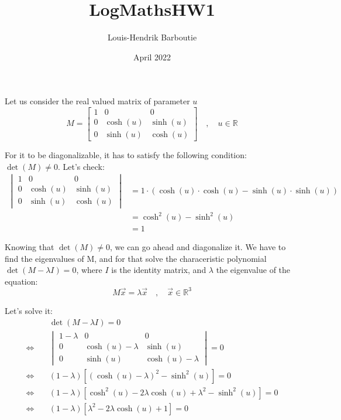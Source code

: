 \documentclass{article}
\title{LogMathsHW1}
\author{Louis-Hendrik Barboutie}
\date{April 2022}
\begin{document}
\maketitle

Let us consider the real valued matrix of parameter $u$
\begin{equation} 
M = \begin{bmatrix}
    1 & 0 & 0 \\
    0 & \cosh(u) & \sinh(u) \\
    0 & \sinh(u) & \cosh(u)
\end{bmatrix}
\quad,\quad u \in \mathbb{R} 
\end{equation} 

For it to be diagonalizable, it has to satisfy the following condition: $\det(M) \neq 0$. Let's check:
\begin{align*}
    \begin{vmatrix}
        1 & 0 & 0 \\ 0 & \cosh(u) & \sinh(u) \\ 0 & \sinh(u) & \cosh(u) \end{vmatrix} &= 1 \cdot (\cosh(u) \cdot \cosh(u) - \sinh(u) \cdot \sinh(u)) \\ 
    &= \cosh^2(u) - \sinh^2(u) \\
    &= 1
\end{align*}

Knowing that $\det(M) \neq 0$, we can go ahead and diagonalize it. We have to find the eigenvalues of M, and for that solve the characeristic polynomial $\det(M-\lambda I) = 0$, where $I$ is the identity matrix, and $\lambda$ the eigenvalue of the equation:
\begin{equation}
    M \Vec{x} = \lambda \Vec{x} \quad,\quad \Vec{x} \in \mathbb{R}^3 
\end{equation}

Let's solve it:
\begin{align*}
    &\det(M-\lambda I) = 0 \\ 
    \Leftrightarrow \quad &\begin{vmatrix} 1 - \lambda & 0 & 0 \\ 0 & \cosh(u) - \lambda & \sinh(u) \\ 0 & \sinh(u) & \cosh(u) - \lambda   \end{vmatrix} = 0 \\
    \Leftrightarrow \quad &(1 - \lambda)[(\cosh(u) - \lambda)^2 - \sinh^2(u)] = 0 \\ 
    \Leftrightarrow \quad &(1 - \lambda)[\cosh^2(u) - 2 \lambda \cosh(u) + \lambda^2 - \sinh^2(u)] = 0 \\
    \Leftrightarrow \quad &(1 - \lambda)[\lambda^2 - 2 \lambda \cosh(u) + 1] = 0
\end{align*}
\end{document}
